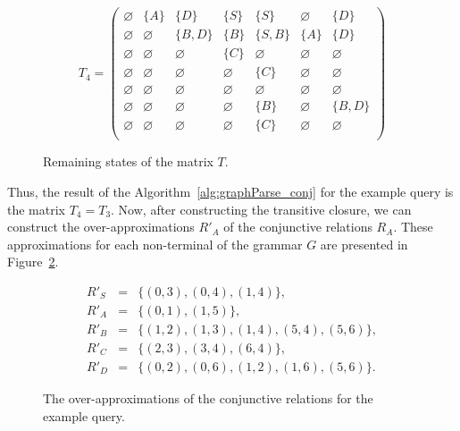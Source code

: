 \begin{figure}
	\[
	T_4 = \begin{pmatrix}
	\varnothing & \{A\} & \{D\} & \{S\} & \{S\} & \varnothing & \{D\} \\
	
	\varnothing & \varnothing & \{B, D\} & \{B\} & \{S,B\} & \{A\} & \{D\} \\
	
	\varnothing & \varnothing & \varnothing & \{C\} & \varnothing & \varnothing & \varnothing \\
	
	\varnothing & \varnothing & \varnothing & \varnothing & \{C\} & \varnothing & \varnothing \\
	
	\varnothing & \varnothing & \varnothing & \varnothing & \varnothing & \varnothing & \varnothing \\
	
	\varnothing & \varnothing & \varnothing & \varnothing & \{B\} & \varnothing & \{B, D\} \\
	
	\varnothing & \varnothing & \varnothing & \varnothing & \{C\} & \varnothing & \varnothing \\
	\end{pmatrix}
	\]
	\caption{Remaining states of the matrix $T$.}
	\label{ConjExampleQueryFinalIterations}
\end{figure}

Thus, the result of the Algorithm~\ref{alg:graphParse_conj} for the example query is the matrix $T_4 = T_3$. Now, after constructing the transitive closure, we can construct the over-approximations $R'_A$ of the conjunctive relations $R_A$. These approximations for each non-terminal of the grammar $G$ are presented in Figure~\ref{ConjExampleQueryCFRelations}.

\begin{figure}
	\begin{eqnarray}
		R'_S&=&\{(0,3),(0,4),(1,4)\},\\
		R'_{A}&=&\{(0,1),(1,5)\},\\
		R'_{B}&=&\{(1,2),(1,3),(1,4),(5,4),(5,6)\}, \\
		R'_{C}&=&\{(2,3),(3,4),(6,4)\}, \\
		R'_{D}&=&\{(0,2),(0,6),(1,2),(1,6),(5,6)\}.
	\end{eqnarray}
	\caption{The over-approximations of the conjunctive relations for the example query.}
	\label{ConjExampleQueryCFRelations}
\end{figure}

